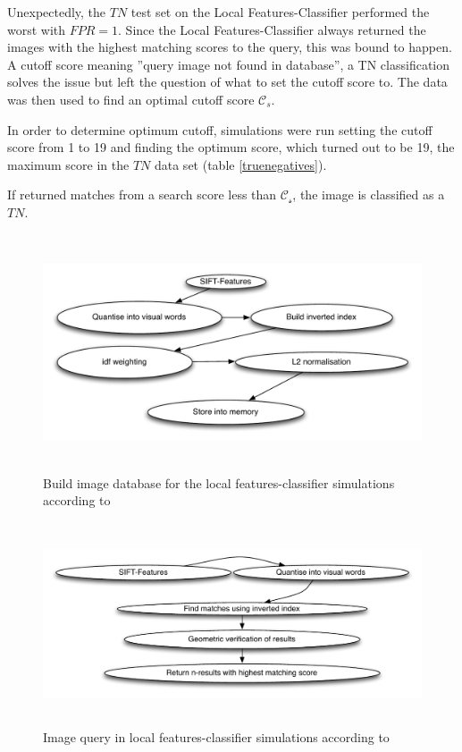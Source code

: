 \documentclass[english,12pt,a4paper,pdftex,elec,utf8]{aaltothesis}
\begin{document}
Unexpectedly, the $TN$ test set on the Local Features-Classifier performed the worst with $FPR = 1$. Since the Local Features-Classifier always returned the images with the highest matching scores to the query, this was bound to happen. A cutoff score meaning ''query image not found in database'', a TN classification solves the issue but left the question of what to set the cutoff score to. The data was then used to find an optimal cutoff score $\mathcal{C}_s$.

In order to determine optimum cutoff, simulations were run setting the cutoff score from 1 to 19 and finding the optimum score, which turned out to be 19, the maximum score in the $TN$ data set (table \ref{truenegatives}).

If returned matches from a search score less than $\mathcal{C_s}$, the image is classified as a $TN$.

\begin{figure}[htb]
\begin{center}
\includegraphics[height=7cm]{figures/vedaldigenindex}
\end{center}
\caption{Build image database for the local features-classifier simulations according to \cite{Vedaldi2012}}
\label{vedaldigenindex}
\end{figure}

\begin{figure}[htb]
\begin{center}
\includegraphics[height=6cm]{figures/vedaldiquery}
\end{center}
\caption{Image query in local features-classifier simulations according to \cite{Vedaldi2012}}
\label{vedaldiquery}
\end{figure}
\end{document}
